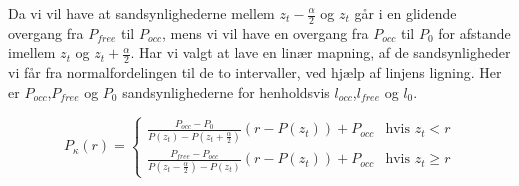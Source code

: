 Da vi vil have at sandsynlighederne mellem $z_t-\frac{\alpha}{2}$ og $z_t$ går i en glidende overgang fra $P_{free}$ til $P_{occ}$,
mens vi vil have en overgang fra $P_{occ}$ til ${P_0}$ for afstande imellem $z_t$ og $z_t+\frac{\alpha}{2}$.
Har vi valgt at lave en linær mapning, af de sandsynligheder vi får fra normalfordelingen til de to intervaller, ved hjælp af linjens ligning.
Her er $P_{occ}$,$P_{free}$ og $P_0$ sandsynlighederne for henholdsvis $l_{occ}$,$l_{free}$ og $l_0$.


\begin{equation}
	P_\kappa(r) = \begin{cases}
		\frac{P_{occ}-P_0}{P(z_t)-P(z_t+\frac{\alpha}{2})}(r-P(z_t))+P_{occ} &\text{hvis } z_t < r \\
		\frac{P_{free}-P_{occ}}{P(z_t-\frac{\alpha}{2})-P(z_t)}(r-P(z_t))+P_{occ} &\text{hvis } z_t \geq r 
	\end{cases}
\end{equation}








